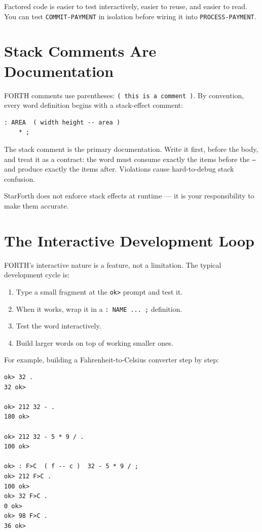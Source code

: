 Factored code is easier to test interactively, easier to reuse, and easier to
read. You can test \texttt{COMMIT-PAYMENT} in isolation before wiring it into
\texttt{PROCESS-PAYMENT}.

\section{Stack Comments Are Documentation}
\label{sec:stack-comments}

FORTH comments use parentheses: \texttt{( this is a comment )}. By
convention, every word definition begins with a stack-effect comment:

\begin{lstlisting}[language=Forth]
: AREA  ( width height -- area )
    * ;
\end{lstlisting}

The stack comment is the primary documentation. Write it first, before the
body, and treat it as a contract: the word must consume exactly the items
before the \texttt{--} and produce exactly the items after. Violations cause
hard-to-debug stack confusion.

StarForth does not enforce stack effects at runtime --- it is your
responsibility to make them accurate.

\section{The Interactive Development Loop}
\label{sec:dev-loop}

FORTH's interactive nature is a feature, not a limitation. The typical
development cycle is:

\begin{enumerate}
  \item Type a small fragment at the \texttt{ok>} prompt and test it.
  \item When it works, wrap it in a \texttt{: NAME ... ;} definition.
  \item Test the word interactively.
  \item Build larger words on top of working smaller ones.
\end{enumerate}

For example, building a Fahrenheit-to-Celsius converter step by step:

\begin{lstlisting}[language=Forth]
ok> 32 .
32 ok>

ok> 212 32 - .
180 ok>

ok> 212 32 - 5 * 9 / .
100 ok>

ok> : F>C  ( f -- c )  32 - 5 * 9 / ;
ok> 212 F>C .
100 ok>
ok> 32 F>C .
0 ok>
ok> 98 F>C .
36 ok>
\end{lstlisting}

